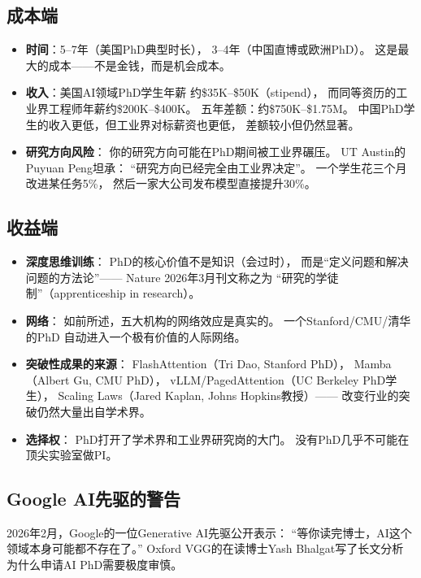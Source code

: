 \subsection{成本端}

\begin{itemize}
  \item \textbf{时间}：5--7年（美国PhD典型时长），
    3--4年（中国直博或欧洲PhD）。
    这是最大的成本——不是金钱，而是机会成本。
  \item \textbf{收入}：美国AI领域PhD学生年薪
    约\$35K--\$50K（stipend），
    而同等资历的工业界工程师年薪约\$200K--\$400K。
    五年差额：约\$750K--\$1.75M。
    中国PhD学生的收入更低，但工业界对标薪资也更低，
    差额较小但仍然显著。
  \item \textbf{研究方向风险}：
    你的研究方向可能在PhD期间被工业界碾压。
    UT Austin的Puyuan Peng坦承：
    ``研究方向已经完全由工业界决定''。
    一个学生花三个月改进某任务5\%，
    然后一家大公司发布模型直接提升30\%。
\end{itemize}

\subsection{收益端}

\begin{itemize}
  \item \textbf{深度思维训练}：
    PhD的核心价值不是知识（会过时），
    而是``定义问题和解决问题的方法论''——
    Nature 2026年3月刊文称之为
    ``研究的学徒制''（apprenticeship in research）。
  \item \textbf{网络}：
    如前所述，五大机构的网络效应是真实的。
    一个Stanford/CMU/清华的PhD
    自动进入一个极有价值的人际网络。
  \item \textbf{突破性成果的来源}：
    FlashAttention（Tri Dao, Stanford PhD），
    Mamba（Albert Gu, CMU PhD），
    vLLM/PagedAttention（UC Berkeley PhD学生），
    Scaling Laws（Jared Kaplan, Johns Hopkins教授）——
    改变行业的突破仍然大量出自学术界。
  \item \textbf{选择权}：
    PhD打开了学术界和工业界研究岗的大门。
    没有PhD几乎不可能在顶尖实验室做PI。
\end{itemize}

\subsection{Google AI先驱的警告}

2026年2月，Google的一位Generative AI先驱公开表示：
``等你读完博士，AI这个领域本身可能都不存在了。''
Oxford VGG的在读博士Yash Bhalgat写了长文分析
为什么申请AI PhD需要极度审慎。

